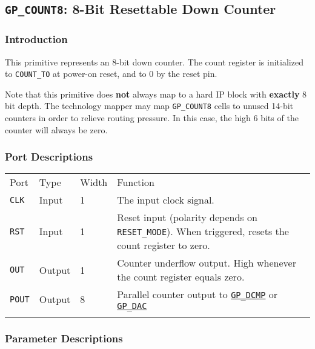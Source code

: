 \documentclass[11pt]{article}
\renewcommand\emph\textbf
\newcommand{\tokenstyle}[1]{\texttt{#1}}
\newcommand{\whenstyle}[1]{{\fontseries{sb}\selectfont#1}}
\newcommand{\tokenref}[2]{\hyperref[#2]{\tokenstyle{#1}}}
\newcommand{\thinhline}{\Xhline{1\arrayrulewidth}}
\newcommand{\thickhline}{\Xhline{2.5\arrayrulewidth}}
\begin{document}
\pagebreak
\subsection{\tokenstyle{GP\_COUNT8}: 8-Bit Resettable Down Counter}
\label{gp-count8}

\subsubsection{Introduction}
This primitive represents an 8-bit down counter. The count register is initialized to \tokenstyle{COUNT\_TO} at
power-on reset, and to 0 by the reset pin.

Note that this primitive does \emph{not} always map to a hard IP block with \emph{exactly} 8 bit depth. The technology
mapper may map \tokenstyle{GP\_COUNT8} cells to unused 14-bit counters in order to relieve routing pressure.
In this case, the high 6 bits of the counter will always be zero.

\subsubsection{Port Descriptions}

\begin{tabularx}{\textwidth}{lllX}
\thinhline
\whenstyle{Port} & \whenstyle{Type} & \whenstyle{Width} & \whenstyle{Function} \\
\thickhline
\tokenstyle{CLK} & Input & 1 & The input clock signal. \\
\thinhline
\tokenstyle{RST} & Input & 1 & Reset input (polarity depends on \tokenstyle{RESET\_MODE}).
	When triggered, resets the count register to zero. \\
\thinhline
\tokenstyle{OUT} & Output & 1 & Counter underflow output. High whenever the count register equals zero. \\
\thinhline
\tokenstyle{POUT} & Output & 8 & Parallel counter output to \tokenref{GP\_DCMP}{gp-dcmp} or \tokenref{GP\_DAC}{gp-dac} \\
\thinhline
\end{tabularx}

\subsubsection{Parameter Descriptions}
\end{document}
